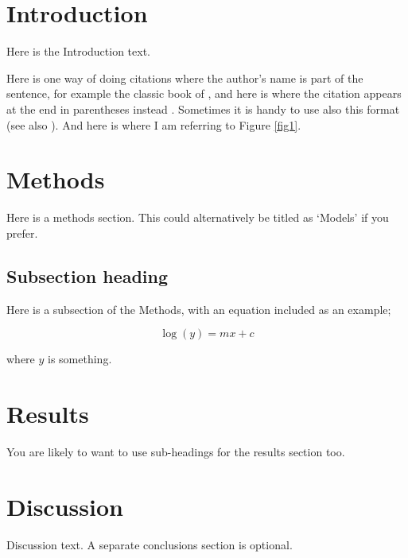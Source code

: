 \documentclass[a4paper,11pt]{article}
\begin{document}
\tableofcontents

\newpage{}

\clearpage
\setcounter{page}{1}

\section{Introduction}
\linenumbers

Here is the Introduction text.

Here is one way of doing citations where the author's name is part of the sentence, for example the classic book of \cite{Kauffman1995}, and here is where the citation appears at the end in parentheses instead \citep{Waddington1942}. Sometimes it is handy to use also this format (see also \citealp{Waddington1942}). And here is where I am referring to Figure \ref{fig1}. 


\newpage{}
\section{Methods}

Here is a methods section. This could alternatively be titled as `Models' if you prefer.

\subsection{Subsection heading}

Here is a subsection of the Methods, with an equation included as an example;

\begin{equation}
\log(y)=mx+c
\end{equation}

where $y$ is something.


\newpage{}
\section{Results}

You are likely to want to use sub-headings for the results section too.


\newpage{}
\section{Discussion}

Discussion text. A separate conclusions section is optional.

\newpage{}

\end{document}
